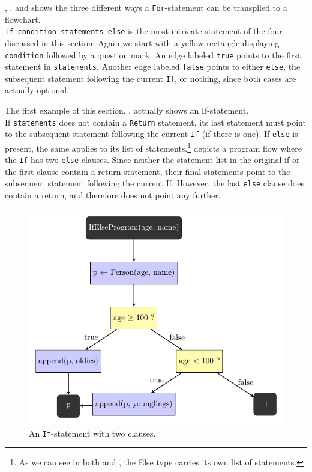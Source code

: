 , , and  shows the three different ways a \texttt{For}-statement can be transpiled to a flowchart. \\

\texttt{If condition statements else} is the most intricate statement of the four discussed in this section. Again we start with a yellow rectangle displaying \texttt{condition} followed by a question mark. An edge labeled \texttt{true} points to the first statement in \texttt{statements}. Another edge labeled \texttt{false} points to either \texttt{else}, the subsequent statement following the current \texttt{If}, or nothing, since both cases are actually optional.

The first example of this section, , actually shows an If-statement. \\

If \texttt{statements} does not contain a \texttt{Return} statement, its last statement must point to the subsequent statement following the current \texttt{If} (if there is one). If \texttt{else} is present, the same applies to its list of statements.\footnote{As we can see in both  and , the Else type carries its own list of statements.}  depicts a program flow where the \texttt{If} has two \texttt{else} clauses. Since neither the statement list in the original if or the first clause contain a return statement, their final statements point to the subsequent statement following the current If. However, the last \texttt{else} clause does contain a return, and therefore does not point any further. \\

\begin{figure}[ht]
    \centering
    \includegraphics[scale=.72]{assets/chapter4/IfElseProgram_ibp.pdf}
    \caption{An \texttt{If}-statement with two clauses.}
    \label{flowchartIf}
\end{figure}

